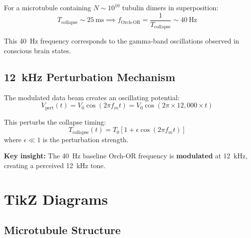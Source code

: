 For a microtubule containing $N \sim 10^{10}$ tubulin dimers in superposition:
\begin{equation}
T_{\text{collapse}} \sim 25~\text{ms} \implies f_{\text{Orch-OR}} = \frac{1}{T_{\text{collapse}}} \sim 40~\text{Hz}
\label{eq:collapse-freq}
\end{equation}

This 40~Hz frequency corresponds to the gamma-band oscillations observed in conscious brain states.

\subsection{12~kHz Perturbation Mechanism}

The modulated data beam creates an oscillating potential:
\begin{equation}
V_{\text{pert}}(t) = V_0 \cos(2\pi f_m t) = V_0 \cos(2\pi \times 12{,}000 \times t)
\label{eq:perturbation}
\end{equation}

This perturbs the collapse timing:
\begin{equation}
T_{\text{collapse}}(t) = T_0 \left[1 + \epsilon \cos(2\pi f_m t)\right]
\label{eq:perturbed-collapse}
\end{equation}
where $\epsilon \ll 1$ is the perturbation strength.

\textbf{Key insight:} The 40~Hz baseline Orch-OR frequency is \textbf{modulated} at 12~kHz, creating a perceived 12~kHz tone.

\section{TikZ Diagrams}

\subsection{Microtubule Structure}

